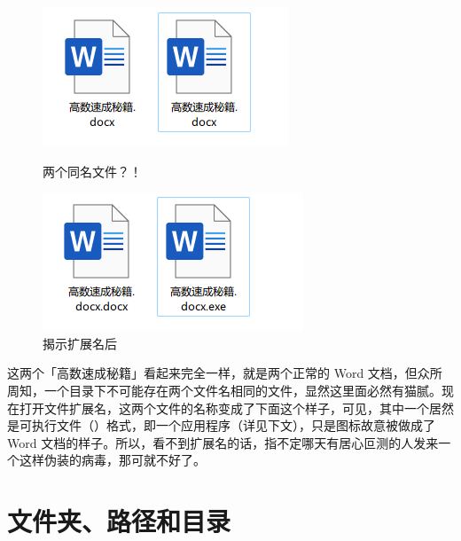\begin{figure}[htb!]
  \centering
  \begin{minipage}{.48\textwidth}
    \centering
    \includegraphics[width=.95\textwidth]{assets/basic/fake_doc.png}
    \caption{两个同名文件？！}
    \label{fig:fake_doc}
  \end{minipage}
  \begin{minipage}{.48\textwidth}
    \centering
    \includegraphics[width=.95\textwidth]{assets/basic/fake_doc_revealed.png}
    \caption{揭示扩展名后}
    \label{fig:fake_doc_revealed}
  \end{minipage}
\end{figure}

这两个「高数速成秘籍」看起来完全一样，就是两个正常的 Word 文档，但众所周知，一个目录下不可能存在两个文件名相同的文件，显然这里面必然有猫腻。现在打开文件扩展名，这两个文件的名称变成了下面这个样子，可见，其中一个居然是可执行文件（）格式，即一个应用程序（详见下文），只是图标故意被做成了 Word 文档的样子。所以，看不到扩展名的话，指不定哪天有居心叵测的人发来一个这样伪装的病毒，那可就不好了。

\section{文件夹、路径和目录}

